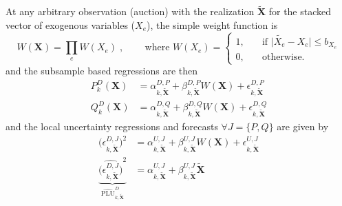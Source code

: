 At any arbitrary observation (auction) with the realization $\boldsymbol{\tilde{X}}$ for the stacked vector of exogenous variables ($X_e$), the simple weight function is 
\begin{equation}
W(\boldsymbol{X}) =  \prod_{e} W(X_e) \; \text{,} \quad  \quad  \text{ where  } 
W(X_e) = \begin{cases} 1, \quad & \mbox{if } \vert \tilde{X_e} - X_e \vert \leq b_{X_e} 
\\ 
0, \quad & \mbox{otherwise. } \end{cases}
\end{equation}
and the subsample based regressions are then
\begin{align}
P^D_k(\boldsymbol{X}) &= \alpha^{D,P}_{k,\boldsymbol{\tilde{X}}} + \beta^{D,P}_{k,\boldsymbol{\tilde{X}}} W(\boldsymbol{X}) + \epsilon^{D,P}_{k,\boldsymbol{\tilde{X}}} \\
Q^D_k(\boldsymbol{X}) &= \alpha^{D,Q}_{k,\boldsymbol{\tilde{X}}} + \beta^{D,Q}_{k,\boldsymbol{\tilde{X}}} W(\boldsymbol{X}) + \epsilon^{D,Q}_{k,\boldsymbol{\tilde{X}}} 
\end{align}
and the local uncertainty regressions and forecasts $\forall J=\{P,Q\} $ are given  by
\begin{align}
\bigl(\epsilon^{D,J}_{k,\boldsymbol{\tilde{X}}}\bigr)^2 &= \alpha^{U,J}_{k,\boldsymbol{\tilde{X}}} + \beta^{U,J}_{k,\boldsymbol{\tilde{X}}} W(\boldsymbol{X})  + \epsilon^{U,J}_{k,\boldsymbol{\tilde{X}}} \\
%
\underbrace{\widehat{\bigl(\epsilon^{D,J}_{k,\boldsymbol{\tilde{X}}}\bigr)}^2}_{\widehat{\text{PLU}}^D_{k, \boldsymbol{\tilde{X}}}} &= \alpha^{U,J}_{k,\boldsymbol{\tilde{X}}} + \beta^{U,J}_{k,\boldsymbol{\tilde{X}}} \boldsymbol{\tilde{X}}
\end{align}

